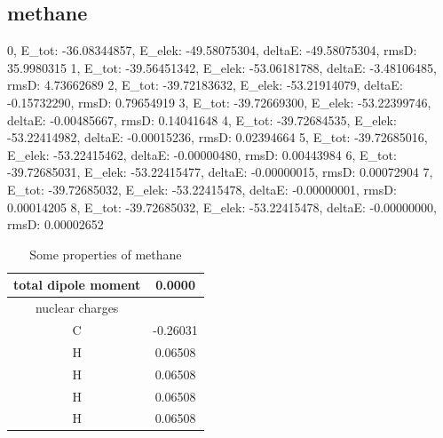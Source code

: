 \subsection{methane}
\label{subsec:methane}
 
\begin{python}[caption={iterations for methane},label={ls:Listing 8},basicstyle=\scriptsize]
0, E_tot: -36.08344857, E_elek: -49.58075304, deltaE: -49.58075304, rmsD:  35.9980315
1, E_tot: -39.56451342, E_elek: -53.06181788, deltaE: -3.48106485, rmsD:  4.73662689
2, E_tot: -39.72183632, E_elek: -53.21914079, deltaE: -0.15732290, rmsD:  0.79654919
3, E_tot: -39.72669300, E_elek: -53.22399746, deltaE: -0.00485667, rmsD:  0.14041648
4, E_tot: -39.72684535, E_elek: -53.22414982, deltaE: -0.00015236, rmsD:  0.02394664
5, E_tot: -39.72685016, E_elek: -53.22415462, deltaE: -0.00000480, rmsD:  0.00443984
6, E_tot: -39.72685031, E_elek: -53.22415477, deltaE: -0.00000015, rmsD:  0.00072904
7, E_tot: -39.72685032, E_elek: -53.22415478, deltaE: -0.00000001, rmsD:  0.00014205
8, E_tot: -39.72685032, E_elek: -53.22415478, deltaE: -0.00000000, rmsD:  0.00002652
\end{python}
 
 \begin{table}[ht]
    \centering
    \begin{tabular}{c|c}
         total dipole moment & 0.0000  \\
         \hline
         nuclear charges &  \\ 
         \hline
         C & -0.26031 \\
         H & 0.06508 \\
         H & 0.06508 \\
         H & 0.06508\\
         H & 0.06508 \\
    \end{tabular}
    \caption{Some properties of methane}
    \label{tab:number2}
\end{table}

